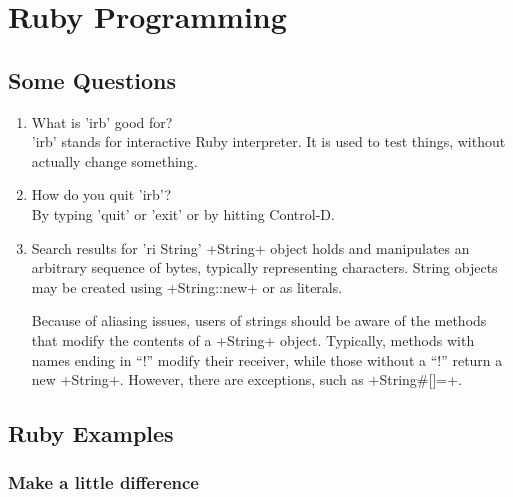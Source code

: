 \documentclass[10pt,a4paper]{scrartcl}
\begin{document}
\section{Ruby Programming}

\subsection{Some Questions}
\begin{enumerate}
\item{What is 'irb' good for?} \\
'irb' stands for interactive Ruby interpreter. It is used to test things, without actually change something.
\item{How do you quit 'irb'?} \\
By typing 'quit' or 'exit' or by hitting Control-D.
\item{Search results for 'ri String'}
 +String+ object holds and manipulates an arbitrary sequence of
     bytes, typically representing characters. String objects may be
     created using +String::new+ or as literals.

     Because of aliasing issues, users of strings should be aware of the
     methods that modify the contents of a +String+ object. Typically,
     methods with names ending in ``!'' modify their receiver, while
     those without a ``!'' return a new +String+. However, there are
     exceptions, such as +String\#[]=+.



\end{enumerate}


\subsection{Ruby Examples}

\subsubsection{Make a little difference}


\end{document}
